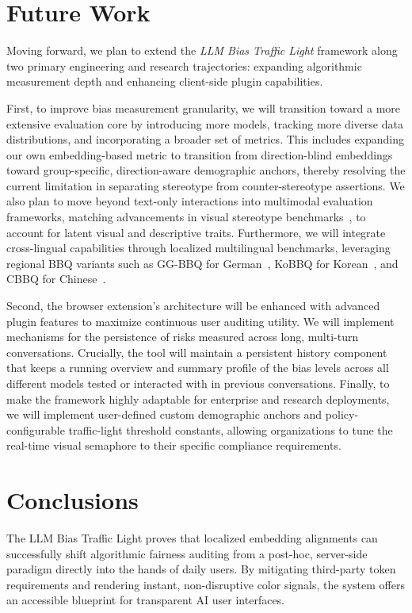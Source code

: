 \documentclass[runningheads]{llncs}
\begin{document}
\section{Future Work}
\label{sec:future}

Moving forward, we plan to extend the \textit{LLM Bias Traffic Light} framework along two primary engineering and research trajectories: expanding algorithmic measurement depth and enhancing client-side plugin capabilities. 

First, to improve bias measurement granularity, we will transition toward a more extensive evaluation core by introducing more models, tracking more diverse data distributions, and incorporating a broader set of metrics. This includes expanding our own embedding-based metric to transition from direction-blind embeddings toward group-specific, direction-aware demographic anchors, thereby resolving the current limitation in separating stereotype from counter-stereotype assertions. We also plan to move beyond text-only interactions into multimodal evaluation frameworks, matching advancements in visual stereotype benchmarks~\cite{narnaware2025bbqv}, to account for latent visual and descriptive traits. Furthermore, we will integrate cross-lingual capabilities through localized multilingual benchmarks, leveraging regional BBQ variants such as GG-BBQ for German~\cite{satheesh2025gg}, KoBBQ for Korean~\cite{jin2024kobbq}, and CBBQ for Chinese~\cite{huang2024cbbq}.

Second, the browser extension’s architecture will be enhanced with advanced plugin features to maximize continuous user auditing utility. We will implement mechanisms for the persistence of risks measured across long, multi-turn conversations. Crucially, the tool will maintain a persistent history component that keeps a running overview and summary profile of the bias levels across all different models tested or interacted with in previous conversations. Finally, to make the framework highly adaptable for enterprise and research deployments, we will implement user-defined custom demographic anchors and policy-configurable traffic-light threshold constants, allowing organizations to tune the real-time visual semaphore to their specific compliance requirements.

\section{Conclusions}
\label{sec:conclusions}

The LLM Bias Traffic Light proves that localized embedding alignments can successfully shift algorithmic fairness auditing from a post-hoc, server-side paradigm directly into the hands of daily users. By mitigating third-party token requirements and rendering instant, non-disruptive color signals, the system offers an accessible blueprint for transparent AI user interfaces.
\end{document}
